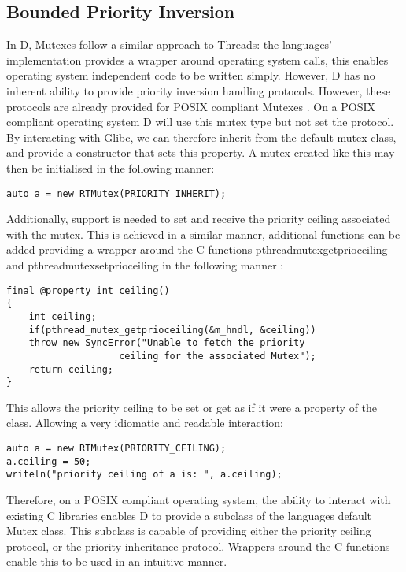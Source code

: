 \subsection{Bounded Priority Inversion}
In D, Mutexes follow a similar approach to Threads: the languages'
implementation provides a wrapper around operating system calls, this 
enables operating system independent code to be written simply. However, D has no 
inherent ability to provide priority inversion handling protocols. 
However, these protocols are already provided for POSIX compliant Mutexes 
\cite{http://linux.die.net/man/3/pthread_mutexattr_setprotocol}. On a POSIX 
compliant operating system D will use this mutex type but not set the protocol. 
By interacting with Glibc, we can therefore inherit from the default mutex class, 
and provide a constructor that sets this property.
A mutex created like this may then be initialised in the following manner: 
\begin{lstlisting}
auto a = new RTMutex(PRIORITY_INHERIT);
\end{lstlisting}
Additionally, support is needed to set and receive the priority ceiling 
associated with the mutex. This is achieved in a similar manner, additional 
functions can be added providing a wrapper around the C functions 
pthread\textunderscore{}mutex\textunderscore{}getprioceiling and 
pthread\textunderscore{}mutex\textunderscore{}setprioceiling
in the following manner 
\cite{http://pubs.opengroup.org/onlinepubs/9699919799/functions/pthread_mutex_getprioceiling.html}:
\begin{lstlisting}
final @property int ceiling()
{
    int ceiling; 
    if(pthread_mutex_getprioceiling(&m_hndl, &ceiling))
    throw new SyncError("Unable to fetch the priority 
                    ceiling for the associated Mutex"); 
    return ceiling; 
}
\end{lstlisting}
This allows the priority ceiling to be set or get as if it were a property of 
the class. Allowing a very idiomatic and readable interaction: 
\begin{lstlisting}
auto a = new RTMutex(PRIORITY_CEILING); 
a.ceiling = 50; 
writeln("priority ceiling of a is: ", a.ceiling); 
\end{lstlisting}
Therefore, on a POSIX compliant operating system, the ability to interact with 
existing C libraries enables D to provide a subclass of the languages default 
Mutex class. This subclass is capable of providing either the priority ceiling 
protocol, or the priority inheritance protocol. Wrappers around the C functions 
enable this to be used in an intuitive manner. 

